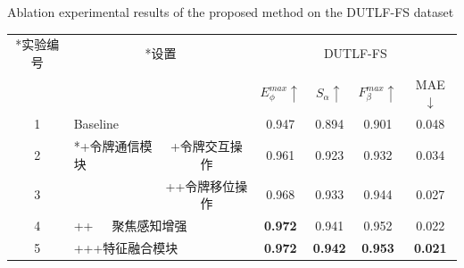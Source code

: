 \begin{table}[t]
	{Ablation experimental results of the proposed method on the DUTLF-FS dataset}
	\centering
	\label{table:abl_total}
	\label{chpt3:table:abl_total}
		\begin{tabular}{cllcccc}
			\toprule[1.5pt]  %
			
			\multicolumn{1}{c}{ \multirow{2}*{实验编号}} 
			& \multicolumn{2}{c}{ \multirow{2}*{设置}}	
			& \multicolumn{4}{c}{DUTLF-FS} \\
			
			\cmidrule(r){4-7} 
			
			& & & $E_{\phi}^{max}\uparrow$ & $S_{\alpha }\uparrow $ & $F_{\beta}^{max}\uparrow$ & MAE$\downarrow$ \\
			
			
			\midrule
			
			1 & \multicolumn{2}{l}{ Baseline }     & 0.947 & 0.894 & 0.901 & 0.048 \\ 
			
			
			\midrule
			
			2 & \multicolumn{1}{l}{ \multirow{2}*{+令牌通信模块}}	
			
			& \multicolumn{1}{c}{+令牌交互操作}  & 0.961 & 0.923 & 0.932 & 0.034 \\ 
			3 & & \multicolumn{1}{c}{++令牌移位操作} & 0.968 & 0.933 & 0.944 & 0.027 \\
			
			\midrule
			
			4 & \multicolumn{2}{l}{++~~~聚焦感知增强} 		
			& \textbf{0.972} & 0.941 & 0.952 & 0.022 \\
			
			5 & \multicolumn{2}{l}{+++特征融合模块} 		
			& \textbf{0.972} & \textbf{0.942} & \textbf{0.953} & \textbf{0.021} \\ 
			
			
			\bottomrule[1.5pt]
		\end{tabular}
\end{table}


